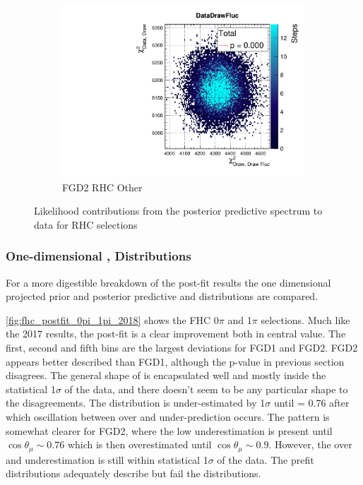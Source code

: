 \begin{figure}[h]
\begin{subfigure}[t]{0.32\textwidth}
		\includegraphics[width=\textwidth, trim={20mm 6mm 4mm 11mm}, clip,page=160]{figures/mach3/2018/data/2018a_FixedCov_RedCov_Mpi_Data_merge_PostPredStore_FullLLH_procs}
		\caption{FGD2 RHC \numu Other}
	\end{subfigure}
	\caption{Likelihood contributions from the posterior predictive spectrum to data for RHC \numu selections}
	\label{fig:posterior_pred_data_rhcnumu_2018}
\end{figure}

\subsubsection{One-dimensional \pmu, \cosmu Distributions}
For a more digestible breakdown of the post-fit results the one dimensional projected prior and posterior predictive \pmu and \cosmu distributions are compared.

\autoref{fig:fhc_postfit_0pi_1pi_2018} shows the FHC 0$\pi$ and 1$\pi$ selections. Much like the 2017 results, the post-fit is a clear improvement both in central value. The first, second and fifth \pmu bins are the largest deviations for FGD1 and FGD2. FGD2 appears better described than FGD1, although the p-value in previous section disagrees. The general shape of \pmu is encapsulated well and mostly inside the statistical 1$\sigma$ of the data, and there doesn't seem to be any particular shape to the disagreements. The \cosmu distribution is under-estimated by 1$\sigma$ until \cosmu= 0.76 after which oscillation between over and under-prediction occurs. The pattern is somewhat clearer for FGD2, where the low \cosmu underestimation is present until $\cos\theta_\mu\sim0.76$ which is then overestimated until $\cos\theta_\mu\sim0.9$. However, the over and underestimation is still within statistical 1$\sigma$ of the data. The prefit distributions adequately describe \cosmu but fail the \pmu distributions.

